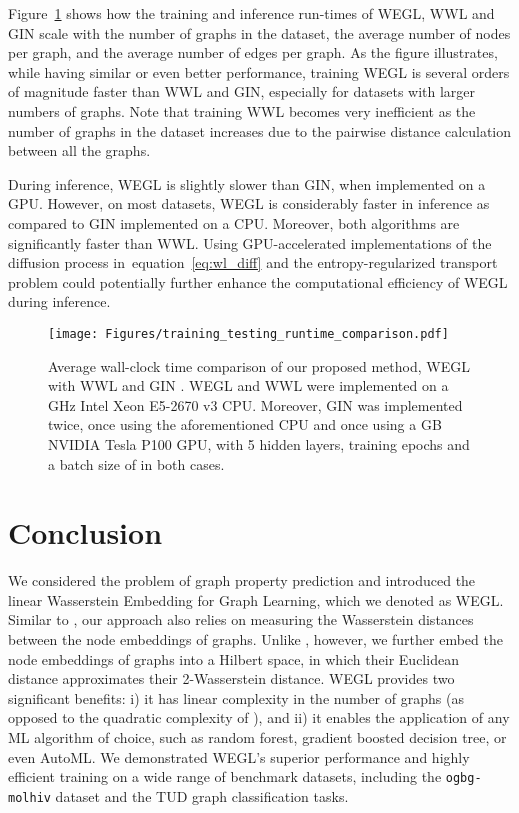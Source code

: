 \documentclass[table]{article} \usepackage{iclr2021_conference,times}
\def\eqref#1{equation~\ref{#1}}
\begin{document}
Figure~\ref{fig:wall_clock} shows how the training and inference run-times of WEGL, WWL and GIN scale with the number of graphs in the dataset, the average number of nodes per graph, and the average number of edges per graph. As the figure illustrates, while having similar or even better performance, training WEGL is several orders of magnitude faster than WWL and GIN, especially for datasets with larger numbers of graphs. Note that training WWL becomes very inefficient as the number of graphs in the dataset increases due to the pairwise distance calculation between all the graphs.

During inference, WEGL is slightly slower than GIN, when implemented on a GPU. However, on most datasets, WEGL is considerably faster in inference as compared to GIN implemented on a CPU. Moreover, both algorithms are significantly faster than WWL. Using GPU-accelerated implementations of the diffusion process in~\eqref{eq:wl_diff} and the entropy-regularized transport problem could potentially further enhance the computational efficiency of WEGL during inference.

\begin{figure}[t]
\centering
\texttt{[image: Figures/training\_testing\_runtime\_comparison.pdf]}
\caption{Average wall-clock time comparison of our proposed method, WEGL with WWL \citep{togninalli2019wasserstein} and GIN \citep{xu2018how}. WEGL and WWL were implemented on a  GHz Intel\textsuperscript{\tiny \textregistered} Xeon\textsuperscript{\tiny \textregistered} E5-2670 v3 CPU. Moreover, GIN was implemented twice, once using the aforementioned CPU and once using a  GB NVIDIA\textsuperscript{\tiny \textregistered} Tesla\textsuperscript{\tiny \textregistered} P100 GPU, with 5 hidden layers,  training epochs and a batch size of  in both cases.}
\label{fig:wall_clock}
\vspace{-.05in}
\end{figure}



\section{Conclusion}
We considered the problem of graph property prediction and introduced the linear Wasserstein Embedding for Graph Learning, which we denoted as WEGL. Similar to \citep{togninalli2019wasserstein}, our approach also relies on measuring the Wasserstein distances between the node embeddings of graphs. Unlike \citep{togninalli2019wasserstein}, however, we further embed the node embeddings of graphs into a Hilbert space, in which their Euclidean distance approximates their 2-Wasserstein distance. WEGL provides two significant benefits: i) it has linear complexity in the number of graphs (as opposed to the quadratic complexity of \citep{togninalli2019wasserstein}), and ii) it enables the application of any ML algorithm of choice, such as random forest, gradient boosted decision tree, or even AutoML. We demonstrated WEGL's superior performance and highly efficient training on a wide range of benchmark datasets, including the \texttt{ogbg-molhiv} dataset and the TUD graph classification tasks. 
\end{document}
